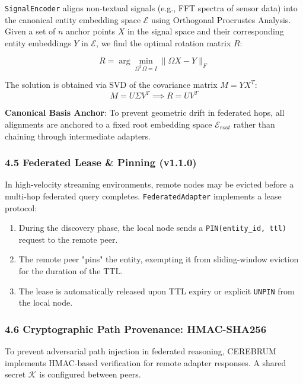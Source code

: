 \documentclass[10pt,journal,compsoc]{IEEEtran}
\begin{document}
\texttt{SignalEncoder} aligns non-textual signals (e.g., FFT spectra of sensor data) into the canonical entity embedding space $\mathcal{E}$ using Orthogonal Procrustes Analysis. Given a set of $n$ anchor points $X$ in the signal space and their corre\-sponding entity embeddings $Y$ in $\mathcal{E}$, we find the optimal rotation matrix $R$:

\begin{equation}
R = \arg\min_{\Omega^T\Omega=I} \| \Omega X - Y \|_F
\end{equation}

The solution is obtained via SVD of the covariance matrix $M = Y X^T$:
\begin{equation}
M = U \Sigma V^T \implies R = U V^T
\end{equation}

\textbf{Canonical Basis Anchor}: To prevent geometric drift in federated hops, all alignments are anchored to a fixed root embedding space $\mathcal{E}_{root}$ rather than chaining through inter\-mediate adapters.

\subsubsection{4.5 Federated Lease \& Pinning (v1.1.0)}

In high-velocity streaming envir\-onments, remote nodes may be evicted before a multi-hop federated query completes. \texttt{FederatedAdapter} implements a lease protocol:
\begin{enumerate}
\item During the discovery phase, the local node sends a \texttt{PIN(entity\_id, ttl)} request to the remote peer.
\item The remote peer "pins" the entity, exempting it from sliding-window eviction for the duration of the TTL.
\item The lease is autom\-atically released upon TTL expiry or explicit \texttt{UNPIN} from the local node.

\end{enumerate}
\subsubsection{4.6 Crypto\-graphic Path Provenance: HMAC-SHA256}

To prevent adversarial path injection in federated reasoning, CEREBRUM implements HMAC-based verif\-ication for remote adapter responses. A shared secret $\mathcal{K}$ is configured between peers. 
\end{document}
